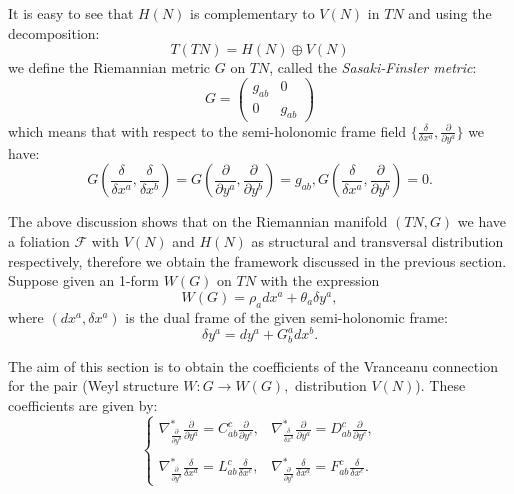 \documentclass[11pt,oneside,english]{amsart}
\numberwithin{equation}{section}
\numberwithin{figure}{section}
\theoremstyle{plain}
\theoremstyle{definition}
\theoremstyle{definition}
\theoremstyle{plain}
\theoremstyle{plain}
\theoremstyle{remark}
\theoremstyle{remark}
\begin{document}
It is easy to see that $H(N)$ is complementary to $V(N)$ in $TN$
and using the decomposition: \begin{equation}
T(TN)=H(N)\oplus V(N)\label{eq:34}\end{equation}
 we define the Riemannian metric $G$ on $TN$, called the \textit{Sasaki-Finsler
metric}: \begin{equation}
G=\left(\begin{array}{ll}
g_{ab} & 0\\
0 & g_{ab}\end{array}\right)\label{eq:35}\end{equation}
 which means that with respect to the semi-holonomic frame field $\{\frac{\delta}{\delta x^{a}},\frac{\partial}{\partial y^{a}}\}$
we have: \begin{equation}
G\left(\frac{\delta}{\delta x^{a}},\frac{\delta}{\delta x^{b}}\right)=G\left(\frac{\partial}{\partial y^{a}},\frac{\partial}{\partial y^{b}}\right)=g_{ab},G\left(\frac{\delta}{\delta x^{a}},\frac{\partial}{\partial y^{b}}\right)=0.\label{eq:36}\end{equation}

The above discussion shows that on the Riemannian manifold $(TN,G)$
we have a foliation $\mathcal{F}$ with $V(N)$ and $H(N)$ as structural
and transversal distribution respectively, therefore we obtain the
framework discussed in the previous section. Suppose given an 1-form
$W(G)$ on $TN$ with the expression \begin{equation}
W(G)=\rho_{a}dx^{a}+\theta_{a}\delta y^{a},\label{eq:37}\end{equation}
 where $(dx^{a},\delta x^{a})$ is the dual frame of the given semi-holonomic
frame: \begin{equation}
\delta y^{a}=dy^{a}+G_{b}^{a}dx^{b}.\label{eq:38}\end{equation}

The aim of this section is to obtain the coefficients of the Vranceanu
connection for the pair (Weyl structure $W:G\rightarrow W(G),$ distribution
$V(N)$). These coefficients are given by: \begin{equation}
\left\{ \begin{array}{ll}
\nabla_{\frac{\partial}{\partial y^{b}}}^{*}\frac{\partial}{\partial y^{a}}=C_{ab}^{c}\frac{\partial}{\partial y^{c}}, & \nabla_{\frac{\delta}{\delta x^{b}}}^{*}\frac{\partial}{\partial y^{a}}=D_{ab}^{c}\frac{\partial}{\partial y^{c}},\\
\\\nabla_{\frac{\partial}{\partial y^{b}}}^{*}\frac{\delta}{\delta x^{a}}=L_{ab}^{c}\frac{\delta}{\delta x^{c}}, & \nabla_{\frac{\partial}{\partial y^{b}}}^{*}\frac{\delta}{\delta x^{a}}=F_{ab}^{c}\frac{\delta}{\delta x^{c}}.\end{array}\right.\label{eq:39}\end{equation}
\end{document}
